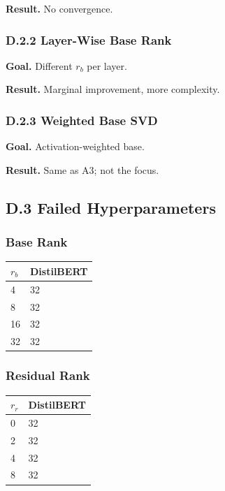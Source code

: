 \textbf{Result.} No convergence.

\subsubsection{D.2.2 Layer-Wise Base Rank}

\textbf{Goal.} Different $r_b$ per layer.

\textbf{Result.} Marginal improvement, more complexity.

\subsubsection{D.2.3 Weighted Base SVD}

\textbf{Goal.} Activation-weighted base.

\textbf{Result.} Same as A3; not the focus.

\subsection{D.3 Failed Hyperparameters}

\subsubsection{Base Rank}

\begin{table}[H]
\centering
\small
\begin{tabular}{ll}
\toprule
\textbf{$r_b$} & \textbf{DistilBERT} \\
\midrule
4 & 32 \\
8 & 32 \\
16 & 32 \\
32 & 32 \\
\bottomrule
\end{tabular}
\end{table}

\subsubsection{Residual Rank}

\begin{table}[H]
\centering
\small
\begin{tabular}{ll}
\toprule
\textbf{$r_r$} & \textbf{DistilBERT} \\
\midrule
0 & 32 \\
2 & 32 \\
4 & 32 \\
8 & 32 \\
\bottomrule
\end{tabular}
\end{table}

